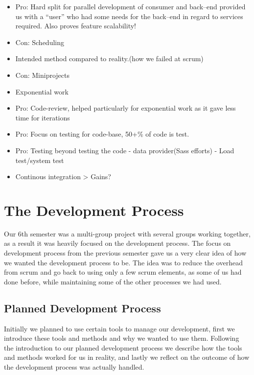\begin{itemize}
    \item Pro: Hard split for parallel development of consumer and back--end provided us with a ``user'' who had some needs for the back--end in regard to services required. Also proves feature scalability!
    \item Con: Scheduling
    \item Intended method compared to reality.(how we failed at scrum)
    \item Con: Miniprojects
    \item Exponential work
    \item Pro: Code-review, helped particularly for exponential work as it gave less time for iterations
    \item Pro: Focus on testing for code-base, 50+\% of code is test.
    \item Pro: Testing beyond testing the code -  data provider(Sass efforts) - Load test/system test
    \item Continous integration > Gains?
\end{itemize}

\section{The Development Process}
Our 6th semester was a multi-group project with several groups working together, as a result it was heavily focused on the development process.
The focus on development process from the previous semester gave us a very clear idea of how we wanted the development process to be.
The idea was to reduce the overhead from scrum and go back to using only a few scrum elements, as some of us had done before, while maintaining some of the other processes we had used.
\subsection{Planned Development Process}
Initially we planned to use certain tools to manage our development, first we introduce these tools and methods and why we wanted to use them.
Following the introduction to our planned development process we describe how the tools and methods worked for us in reality, and lastly we reflect on the outcome of how the development process was actually handled.
